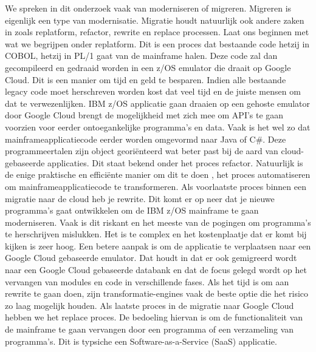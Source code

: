 We spreken in dit onderzoek vaak van moderniseren of migreren. Migreren is eigenlijk een type van modernisatie. Migratie houdt natuurlijk ook andere zaken in zoals replatform, refactor, rewrite en replace processen. Laat ons beginnen met wat we begrijpen onder replatform. Dit is een proces dat bestaande code hetzij in COBOL, hetzij in PL/1 gaat van de mainframe halen. Deze code zal dan gecompileerd en gedraaid worden in een z/OS emulator die draait op Google Cloud. Dit is een manier om tijd en geld te besparen. Indien alle bestaande legacy code moet herschreven worden kost dat veel tijd en de juiste mensen om dat te verwezenlijken. IBM z/OS applicatie gaan draaien op een gehoste emulator door Google Cloud brengt de mogelijkheid met zich mee om API's te gaan voorzien voor eerder ontoegankelijke programma's en data. Vaak is het wel zo dat mainframeapplicatiecode eerder worden omgevormd naar Java of C\#. Deze programmeertalen zijn object georiënteerd wat beter past bij de aard van cloud-gebaseerde applicaties. Dit staat bekend onder het proces refactor. Natuurlijk is de enige praktische en efficiënte manier om dit te doen , het proces automatiseren om mainframeapplicatiecode te transformeren. Als voorlaatste proces binnen een migratie naar de cloud heb je rewrite. Dit komt er op neer dat je nieuwe programma's gaat ontwikkelen om de IBM z/OS mainframe te gaan moderniseren. Vaak is dit riskant en het meeste van de pogingen om programma's te herschrijven mislukken. Het is te complex en het kostenplaatje dat er komt bij kijken is zeer hoog. Een betere aanpak is om de applicatie te verplaatsen naar een Google Cloud gebaseerde emulator. Dat houdt in dat er ook gemigreerd wordt naar een Google Cloud gebaseerde databank en dat de focus gelegd wordt op het vervangen van modules en code in verschillende fases. Als het tijd is om aan rewrite te gaan doen, zijn transformatie-engines vaak de beste optie die het risico zo laag mogelijk houden. Als laatste proces in de migratie naar Google Cloud hebben we het replace proces. De bedoeling hiervan is om de functionaliteit van de mainframe  te gaan vervangen door een programma of een verzameling van programma's. Dit is typsiche een Software-as-a-Service (SaaS) applicatie. 

\subsection{}
\label{sec:De uitdagingen van mainframemodernisatie volgens Astadia}

